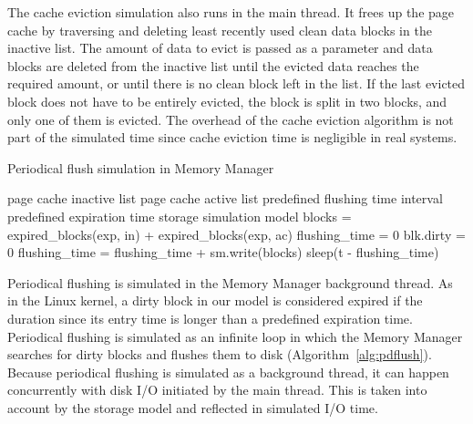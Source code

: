 \documentclass[conference]{IEEEtran}
\newcommand{\Desc}[2]{\State \makebox[2em][l]{#1}#2}
\newcommand{\tristan}[1]{\color{orange}\textbf{From Tristan:}#1\color{black}}
\begin{document}
    The cache eviction simulation also runs in
    the main thread. It frees up the page cache by traversing and deleting
    least recently used clean data blocks in the inactive list.
    The amount of data to evict is passed as a parameter and data blocks are deleted
    from the inactive list until the evicted data reaches the required amount,
    or until there is no clean block left in the list.
    If the last evicted block does not have to be entirely evicted, the block is split in two blocks,
    and only one of them is evicted.
    The overhead of the cache eviction algorithm is not part of the simulated time
    since cache eviction time is negligible in real systems. %

    \begin{algorithm}[b]\caption{Periodical flush simulation in Memory Manager}\label{alg:pdflush}
        \small
        \begin{algorithmic}[1]
            \Input
                \Desc{in}{page cache inactive list}
                \Desc{ac}{page cache active list}
                \Desc{t}{predefined flushing time interval}
                \Desc{exp}{predefined expiration time}
                \Desc{sm}{storage simulation model}
               \EndInput
                \State blocks = expired\_blocks(exp, in) + expired\_blocks(exp, ac)
                \State flushing\_time = 0
                  \State blk.dirty = 0 
                  \State flushing\_time = flushing\_time + sm.write(blocks)
                \EndFor
                    \State sleep(t - flushing\_time)
                \EndIf  
            \EndWhile
        \end{algorithmic}
    \end{algorithm}

    Periodical flushing is simulated in the Memory Manager
    background thread. As in the Linux kernel, a dirty block
    in our model is considered expired if
    the duration since its entry time is longer than a
    predefined expiration time.
    Periodical flushing is simulated as an infinite loop in which
    the Memory Manager searches for dirty blocks and flushes them to disk (Algorithm~\ref{alg:pdflush}).
    Because periodical flushing is simulated as a background thread, it can happen concurrently
    with disk I/O initiated by the main thread. This is taken into account by the
    storage model and reflected in simulated I/O time.
\end{document}
